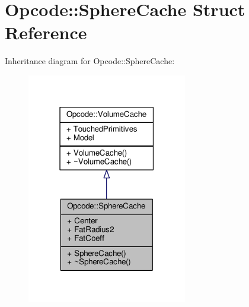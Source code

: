 \hypertarget{structOpcode_1_1SphereCache}{}\section{Opcode\+:\+:Sphere\+Cache Struct Reference}
\label{structOpcode_1_1SphereCache}


Inheritance diagram for Opcode\+:\+:Sphere\+Cache\+:
\nopagebreak
\begin{figure}[H]
\begin{center}
\leavevmode
\includegraphics[width=198pt]{d5/d31/structOpcode_1_1SphereCache__inherit__graph}
\end{center}
\end{figure}



